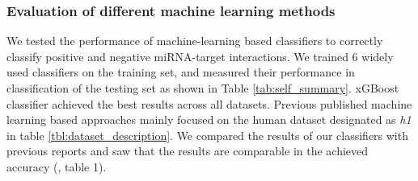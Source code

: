 \documentclass{bmcart}
\begin{document}
\subsubsection*{Evaluation of different machine learning methods} \label{sec:evaluation_different_ML}
We tested the performance of machine-learning based classifiers to correctly classify positive and negative miRNA-target interactions. We trained 6 widely used classifiers on the training set, and measured their performance in classification of the testing set as shown in Table \ref{tab:self_summary}. xGBoost classifier achieved the best results across all datasets. 
Previous published machine learning based approaches mainly focused on the human dataset designated as \textit{h1} in table \ref{tbl:dataset_description}. We compared the results of our classifiers with previous reports and saw that the results are comparable in the achieved accuracy (, table 1). 
\end{document}
